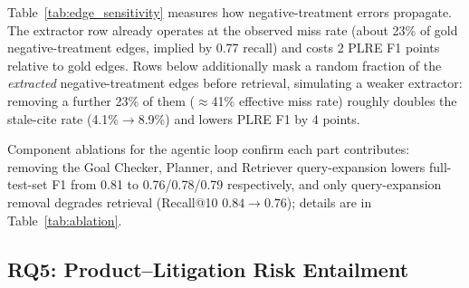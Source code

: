 Table~\ref{tab:edge_sensitivity} measures how negative-treatment errors propagate. The extractor row already operates at the observed miss rate (about 23\% of gold negative-treatment edges, implied by 0.77 recall) and costs 2 PLRE F1 points relative to gold edges. Rows below additionally mask a random fraction of the \emph{extracted} negative-treatment edges before retrieval, simulating a weaker extractor: removing a further 23\% of them ($\approx$41\% effective miss rate) roughly doubles the stale-cite rate (4.1\%$\rightarrow$8.9\%) and lowers PLRE F1 by 4 points.

\begin{table}[t]
\centering
\caption{Edge-error propagation audit. ``Mask $x$\%'' rows also remove $x$\% of extracted negative-treatment edges (closures or down-weights). Effective miss rate $\approx1-0.77(1-x)$ from the extractor's 0.77 recall; $\Delta$F1 is relative to the extractor row.}
\label{tab:edge_sensitivity}
\small
\setlength{\tabcolsep}{4pt}
\end{table}

Component ablations for the agentic loop confirm each part contributes: removing the Goal Checker, Planner, and Retriever query-expansion lowers full-test-set F1 from 0.81 to 0.76/0.78/0.79 respectively, and only query-expansion removal degrades retrieval (Recall@10 $0.84\!\rightarrow\!0.76$); details are in Table~\ref{tab:ablation}.

\subsection{RQ5: Product--Litigation Risk Entailment}

